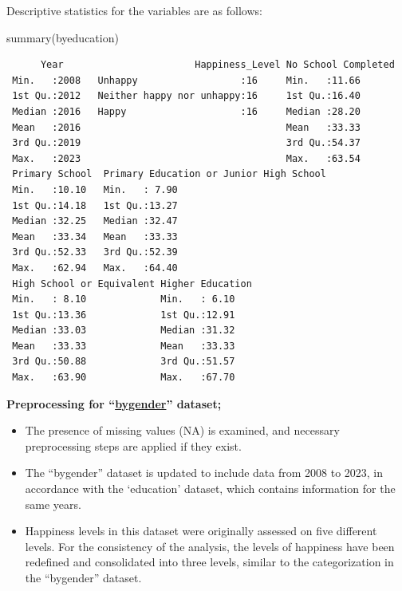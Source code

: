\documentclass[
  11pt,
  a4paper,
  DIV=11,
  numbers=noendperiod]{scrartcl}
\newenvironment{Shaded}{\begin{snugshade}}{\end{snugshade}}
\newcommand{\FunctionTok}[1]{\textcolor[rgb]{0.28,0.35,0.67}{#1}}
\newcommand{\NormalTok}[1]{\textcolor[rgb]{0.00,0.23,0.31}{#1}}
\begin{document}
Descriptive statistics for the variables are as follows:

\begin{Shaded}
\begin{Highlighting}[]
 \FunctionTok{summary}\NormalTok{(byeducation)}
\end{Highlighting}
\end{Shaded}

\begin{verbatim}
      Year                       Happiness_Level No School Completed
 Min.   :2008   Unhappy                  :16     Min.   :11.66      
 1st Qu.:2012   Neither happy nor unhappy:16     1st Qu.:16.40      
 Median :2016   Happy                    :16     Median :28.20      
 Mean   :2016                                    Mean   :33.33      
 3rd Qu.:2019                                    3rd Qu.:54.37      
 Max.   :2023                                    Max.   :63.54      
 Primary School  Primary Education or Junior High School
 Min.   :10.10   Min.   : 7.90                          
 1st Qu.:14.18   1st Qu.:13.27                          
 Median :32.25   Median :32.47                          
 Mean   :33.34   Mean   :33.33                          
 3rd Qu.:52.33   3rd Qu.:52.39                          
 Max.   :62.94   Max.   :64.40                          
 High School or Equivalent Higher Education
 Min.   : 8.10             Min.   : 6.10   
 1st Qu.:13.36             1st Qu.:12.91   
 Median :33.03             Median :31.32   
 Mean   :33.33             Mean   :33.33   
 3rd Qu.:50.88             3rd Qu.:51.57   
 Max.   :63.90             Max.   :67.70   
\end{verbatim}

\textbf{Preprocessing for
``\href{https://github.com/emu-hacettepe-analytics/emu660-spring2025-ecavusgil}{bygender}''
dataset;}

\begin{itemize}
\item
  The presence of missing values (NA) is examined, and necessary
  preprocessing steps are applied if they exist.
\item
  The ``bygender'' dataset is updated to include data from 2008 to 2023,
  in accordance with the `education' dataset, which contains information
  for the same years.
\item
  Happiness levels in this dataset were originally assessed on five
  different levels. For the consistency of the analysis, the levels of
  happiness have been redefined and consolidated into three levels,
  similar to the categorization in the ``bygender'' dataset.
\end{itemize}
\end{document}
